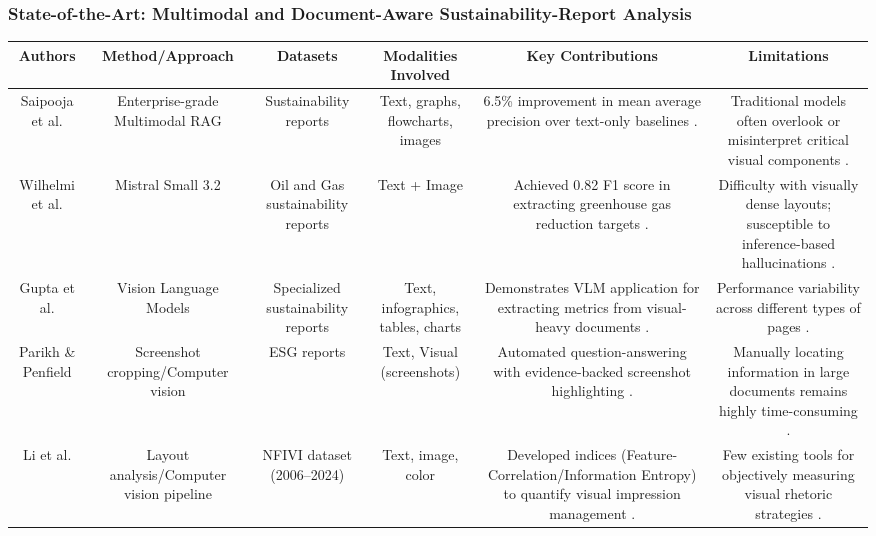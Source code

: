 \documentclass{article}
\begin{document}
\subsubsection{State-of-the-Art: Multimodal and Document-Aware Sustainability-Report Analysis}
\begin{table}[h!]
\centering
\begin{tabular}{|c|c|c|c|c|c|}
\hline
Authors & Method/Approach & Datasets & Modalities Involved & Key Contributions & Limitations \\ \hline
Saipooja et al.  \parencite{g_saipooja_m_n_488bfdd6} & Enterprise-grade Multimodal RAG & Sustainability reports & Text, graphs, flowcharts, images & 6.5\% improvement in mean average precision over text-only baselines  \parencite{g_saipooja_m_n_488bfdd6}. & Traditional models often overlook or misinterpret critical visual components  \parencite{g_saipooja_m_n_488bfdd6}. \\ \hline
Wilhelmi et al.  \parencite{lars_wilhelmi_8d7e860b} & Mistral Small 3.2 & Oil and Gas sustainability reports & Text + Image & Achieved 0.82 F1 score in extracting greenhouse gas reduction targets  \parencite{lars_wilhelmi_8d7e860b}. & Difficulty with visually dense layouts; susceptible to inference-based hallucinations  \parencite{lars_wilhelmi_8d7e860b}. \\ \hline
Gupta et al.  \parencite{tanay_gupta_aafe0c6a} & Vision Language Models & Specialized sustainability reports & Text, infographics, tables, charts & Demonstrates VLM application for extracting metrics from visual-heavy documents  \parencite{tanay_gupta_aafe0c6a}. & Performance variability across different types of pages  \parencite{tanay_gupta_aafe0c6a}. \\ \hline
Parikh \& Penfield  \parencite{pulkit_parikh_19ae49ff} & Screenshot cropping/Computer vision & ESG reports & Text, Visual (screenshots) & Automated question-answering with evidence-backed screenshot highlighting  \parencite{pulkit_parikh_19ae49ff}. & Manually locating information in large documents remains highly time-consuming  \parencite{pulkit_parikh_19ae49ff}. \\ \hline
Li et al.  \parencite{bingjie_li_487d69fd} & Layout analysis/Computer vision pipeline & NFIVI dataset (2006–2024) & Text, image, color & Developed indices (Feature-Correlation/Information Entropy) to quantify visual impression management  \parencite{bingjie_li_487d69fd}. & Few existing tools for objectively measuring visual rhetoric strategies  \parencite{bingjie_li_487d69fd}. \\ \hline

\end{tabular}
\end{table}
\end{document}
